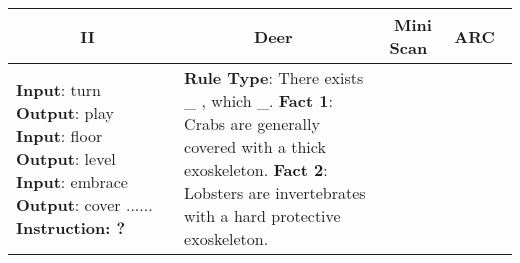 

\begin{table*}[tb]
  \renewcommand\arraystretch{1.1}
  \centering
  \setlength{\tabcolsep}{1.5mm}
  \small
  \begin{tabular}{p{3cm}|p{3.5cm}|p{3.5cm}|p{4.3cm}}
    \toprule[1pt]
    \multicolumn{1}{c}{\textbf{II}~\cite{honovich2023instruction}} & \multicolumn{1}{c}{\textbf{Deer}~\cite{yang2024language}} & \multicolumn{1}{c}{\textbf{Mini Scan}~\cite{qiuphenomenal}} & \multicolumn{1}{c}{\textbf{ARC}~\cite{chollet2019measure}} \\
    \midrule[0.5pt]

    \begin{minipage}{3cm}
    \vspace{-4mm}
      \footnotesize
      \textbf{Input}: turn \newline
      \textbf{Output}: play \newline
      \newline
      \textbf{Input}: floor \newline
      \textbf{Output}: level \newline
      \newline
      \textbf{Input}: embrace \newline
      \textbf{Output}: cover \newline
      ......
      \newline
      \textbf{Instruction: ?}
    \end{minipage}
    &
    \begin{minipage}{3.5cm}
      \footnotesize
      \textbf{Rule Type}: \newline
      There exists \_ , which \_. \newline
      \newline
      \textbf{Fact 1}: \newline
      Crabs are generally covered with a thick exoskeleton. \newline
      \newline
      \textbf{Fact 2}: \newline
      Lobsters are invertebrates with a hard protective exoskeleton. \newline

\end{minipage}
\end{tabular}
\end{table*}
